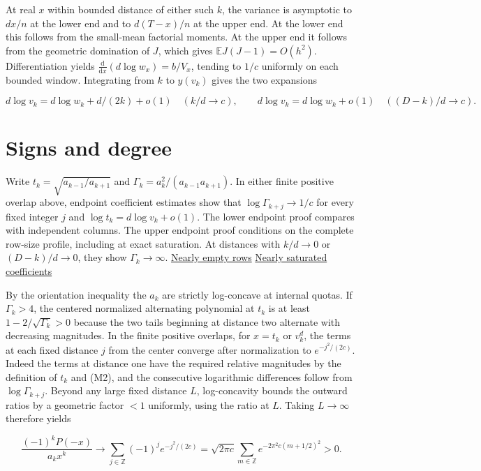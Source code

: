At real $x$ within bounded distance of either such $k$, the variance is asymptotic to $dx/n$ at the lower end and to $d(T-x)/n$ at the upper end. At the lower end this follows from the small-mean factorial moments. At the upper end it follows from the geometric domination of $J$, which gives $\mathbb E J(J-1)=O(h^2)$. Differentiation yields $\frac{\mathrm d}{\mathrm dx}(d\log w_x)=b/V_x$, tending to $1/c$ uniformly on each bounded window. Integrating from $k$ to $y(v_k)$ gives the two expansions

\begin{equation}
d\log v_k=d\log w_k+d/(2k)+o(1)\quad(k/d\to c),
\qquad d\log v_k=d\log w_k+o(1)\quad((D-k)/d\to c).
\tag{M2}
\end{equation}

\section{Signs and degree}

Write $t_k=\sqrt{a_{k-1}/a_{k+1}}$ and $\Gamma_k=a_k^2/(a_{k-1}a_{k+1})$. In either finite positive overlap above, endpoint coefficient estimates show that $\log\Gamma_{k+j}\to1/c$ for every fixed integer $j$ and $\log t_k=d\log v_k+o(1)$. The lower endpoint proof compares with independent columns. The upper endpoint proof conditions on the complete row-size profile, including at exact saturation. At distances with $k/d\to0$ or $(D-k)/d\to0$, they show $\Gamma_k\to\infty$. \hyperref[sec:nearly-empty]{Nearly empty rows} \enspace \hyperref[sec:upper-quota]{Nearly saturated coefficients}

By the orientation inequality the $a_k$ are strictly log-concave at internal quotas. If $\Gamma_k>4$, the centered normalized alternating polynomial at $t_k$ is at least $1-2/\sqrt{\Gamma_k}>0$ because the two tails beginning at distance two alternate with decreasing magnitudes. In the finite positive overlaps, for $x=t_k$ or $v_k^d$, the terms at each fixed distance $j$ from the center converge after normalization to $e^{-j^2/(2c)}$. Indeed the terms at distance one have the required relative magnitudes by the definition of $t_k$ and (M2), and the consecutive logarithmic differences follow from $\log\Gamma_{k+j}$. Beyond any large fixed distance $L$, log-concavity bounds the outward ratios by a geometric factor $<1$ uniformly, using the ratio at $L$. Taking $L\to\infty$ therefore yields

\begin{equation*}
\frac{(-1)^kP(-x)}{a_kx^k}\longrightarrow
\sum_{j\in\mathbb Z}(-1)^j e^{-j^2/(2c)}
=\sqrt{2\pi c}\sum_{m\in\mathbb Z}e^{-2\pi^2 c(m+1/2)^2}>0.
\end{equation*}

